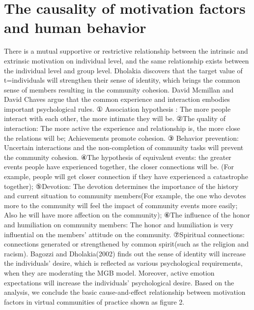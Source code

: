 \documentclass{elsarticle}
\begin{document}
 

\section{The causality of motivation factors and human behavior}
\label{sec:modeling-process}

There is a mutual supportive or restrictive relationship between the
intrinsic and extrinsic motivation on individual level, and the same
relationship exists between the individual level and group
level. Dholakia discovers that the target value of t=individuals will
strengthen their sense of identity, which brings the common sense of
members resulting in the community cohesion\cite{dholakia2004sim}. David Mcmillan and David
Chaves argue that the common experience and interaction embodies
important psychological rules. ① Association hypothesis : The more
people interact with each other, the more intimate they will be. ②The
quality of interaction: The more active the experience and
relationship is, the more close the relations will be; Achievements
promote cohesion. ③ Behavior prevention: Uncertain interactions and
the non-completion of community tasks will prevent the community
cohesion. ④The hypothesis of equivalent events: the greater events
people have experienced together, the closer connections will be. (For
example, people will get closer connection if they have experienced a
catastrophe together); ⑤Devotion: The devotion determines the
importance of the history and current situation to community
members(For example, the one who devotes more to the community will
feel the impact of community events more easily; Also he will have
more affection on the community); ⑥The influence of the honor and
humiliation on community members: The honor and humiliation is very
influential on the members’ attitude on the community. ⑦Spiritual
connections: connections generated or strengthened by common
spirit(such as the religion and racism)\cite{mcmillan1986scd}. Bagozzi and
Dholakia(2002) finds out the sense of identity will increase the
individuals’ desire, which is reflected as various psychological
requirements, when they are moderating the MGB model. Moreover, active
emotion expectations will increase the individuals’ psychological
desire\cite{richard_p._bagozzi_intentional_2002}. Based on the analysis, we conclude the basic
cause-and-effect relationship between motivation factors in virtual
communities of practice shown as figure 2.
\end{document}
